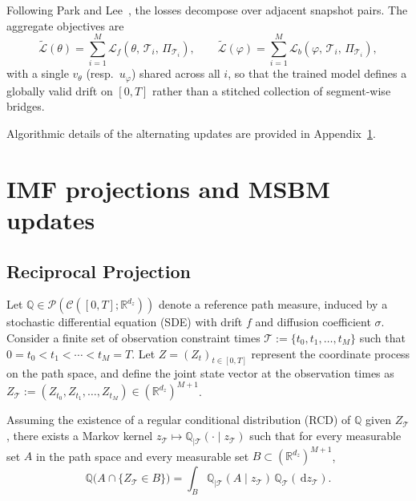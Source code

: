 \documentclass[review,onefignum,onetabnum]{siamart250211}
\newcommand{\R}{\mathbb{R}}
\newcommand{\dd}{\,\mathrm{d}}
\newcommand{\1}{\mathbf{1}}
\newcommand{\cP}{\mathcal{P}}
\newcommand{\bphi}{\varphi}
\begin{document}
Following Park and Lee~\cite[Algorithm~1]{park2025msbm}, the losses
 decompose over adjacent snapshot pairs. The aggregate objectives are
\begin{equation}
  \tilde{\mathcal{L}}(\theta)
  =\sum_{i=1}^{M}
    \mathcal{L}_f\!\left(\theta,\,\mathcal{T}_i,\,
      \Pi_{\mathcal{T}_i}\right),
  \qquad
  \tilde{\mathcal{L}}(\bphi)
  =\sum_{i=1}^{M}
    \mathcal{L}_b\!\left(\bphi,\,\mathcal{T}_i,\,
      \Pi_{\mathcal{T}_i}\right),
  \label{eq:aggregate_losses}
\end{equation}
with a single $v_\theta$ (resp.\ $u_\bphi$) shared across all $i$, so
that the trained model defines a globally valid drift on $[0,T]$
rather than a stitched collection of segment-wise bridges.

Algorithmic details of the alternating updates are provided in Appendix~\ref{app:imf_projections}.


\appendix
\section{IMF projections and MSBM updates}\label{app:imf_projections}
\subsection{Reciprocal Projection}
Let $\mathbb{Q} \in \cP(\mathcal{C}([0,T];\R^{d_z}))$ denote a reference path measure, induced by a stochastic differential equation (SDE) with drift $f$ and diffusion coefficient $\sigma$. Consider a finite set of observation constraint times $\mathcal{T} := \{t_0, t_1, \ldots, t_M\}$ such that $0 = t_0 < t_1 < \cdots < t_M = T$. Let $Z = (Z_t)_{t\in[0,T]}$ represent the coordinate process on the path space, and define the joint state vector at the observation times as $Z_{\mathcal{T}} := (Z_{t_0}, Z_{t_1}, \ldots, Z_{t_M}) \in (\R^{d_z})^{M+1}$.

Assuming the existence of a regular conditional distribution (RCD) of $\mathbb{Q}$ given $Z_{\mathcal{T}}$, there exists a Markov kernel $z_{\mathcal{T}} \mapsto \mathbb{Q}_{\mid\mathcal{T}}(\cdot \mid z_{\mathcal{T}})$ such that for every measurable set $A$ in the path space and every measurable set $B \subset (\R^{d_z})^{M+1}$,
\begin{equation}
\mathbb{Q}\big(A \cap \{Z_{\mathcal{T}} \in B\}\big) = \int_{B} \mathbb{Q}_{\mid\mathcal{T}}(A \mid z_{\mathcal{T}}) \, \mathbb{Q}_{\mathcal{T}}(\dd z_{\mathcal{T}}).
\end{equation}
\end{document}

